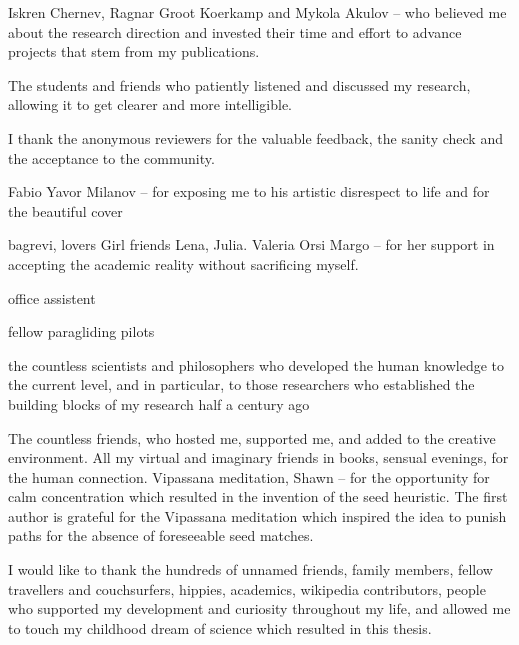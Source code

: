 Iskren Chernev, Ragnar Groot Koerkamp and Mykola Akulov -- who believed me about
the research direction and invested their time and effort to advance projects
that stem from my publications.

The students and friends who patiently listened and discussed my research,
allowing it to get clearer and more intelligible.

I thank the anonymous reviewers for the valuable feedback, the sanity check and
the acceptance to the community. 


Fabio
Yavor Milanov -- for exposing me to his artistic disrespect to life and for the beautiful cover

bagrevi, lovers 
Girl friends Lena, Julia.
Valeria Orsi 
Margo -- for her support in accepting the academic reality without sacrificing myself.

office assistent

fellow paragliding pilots

the countless scientists and philosophers who developed the human knowledge to
the current level, and in particular, to those researchers who established the
building blocks of my research half a century ago


The countless friends, who hosted me, supported me, and added to the creative
environment. All my virtual and imaginary friends in books, sensual evenings,
for the human connection. Vipassana meditation, Shawn -- for the opportunity for
calm concentration which resulted in the invention of the seed heuristic. The
first author is grateful for the Vipassana meditation which inspired the idea to
punish paths for the absence of foreseeable seed matches.

I would like to thank the hundreds of unnamed friends, family members, fellow
travellers and couchsurfers, hippies, academics, wikipedia contributors, people
who supported my development and curiosity throughout my life, and allowed me to
touch my childhood dream of science which resulted in this thesis.

\endgroup
